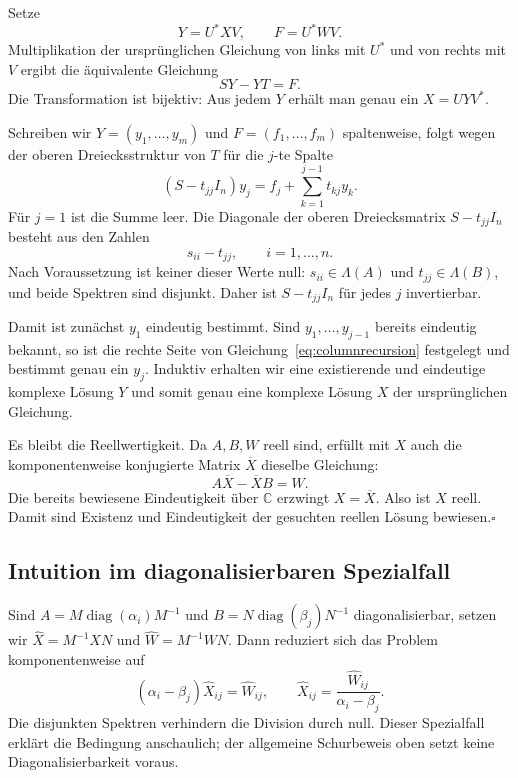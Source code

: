 \documentclass[11pt,a4paper]{article}
\begin{document}
Setze
\begin{equation}
 Y=U^*XV,\qquad F=U^*WV.
\end{equation}
Multiplikation der ursprünglichen Gleichung von links mit $U^*$ und von rechts mit $V$ ergibt die äquivalente Gleichung
\begin{equation}\label{eq:schursylvester}
 SY-YT=F.
\end{equation}
Die Transformation ist bijektiv: Aus jedem $Y$ erhält man genau ein $X=UYV^*$.

Schreiben wir $Y=(y_1,\ldots,y_m)$ und $F=(f_1,\ldots,f_m)$ spaltenweise, folgt wegen der oberen Dreiecksstruktur von $T$ für die $j$-te Spalte
\begin{equation}\label{eq:columnrecursion}
 (S-t_{jj}I_n)y_j
 =f_j+\sum_{k=1}^{j-1}t_{kj}y_k.
\end{equation}
Für $j=1$ ist die Summe leer. Die Diagonale der oberen Dreiecksmatrix $S-t_{jj}I_n$ besteht aus den Zahlen
\begin{equation}
 s_{ii}-t_{jj},\qquad i=1,\ldots,n.
\end{equation}
Nach Voraussetzung ist keiner dieser Werte null: $s_{ii}\in\Lambda(A)$ und $t_{jj}\in\Lambda(B)$, und beide Spektren sind disjunkt. Daher ist $S-t_{jj}I_n$ für jedes $j$ invertierbar.

Damit ist zunächst $y_1$ eindeutig bestimmt. Sind $y_1,\ldots,y_{j-1}$ bereits eindeutig bekannt, so ist die rechte Seite von Gleichung~\eqref{eq:columnrecursion} festgelegt und bestimmt genau ein $y_j$. Induktiv erhalten wir eine existierende und eindeutige komplexe Lösung $Y$ und somit genau eine komplexe Lösung $X$ der ursprünglichen Gleichung.

Es bleibt die Reellwertigkeit. Da $A,B,W$ reell sind, erfüllt mit $X$ auch die komponentenweise konjugierte Matrix $\overline X$ dieselbe Gleichung:
\begin{equation}
 A\overline X-\overline X B=W.
\end{equation}
Die bereits bewiesene Eindeutigkeit über $\mathbb C$ erzwingt $X=\overline X$. Also ist $X$ reell. Damit sind Existenz und Eindeutigkeit der gesuchten reellen Lösung bewiesen.\hfill$\square$

\subsection{Intuition im diagonalisierbaren Spezialfall}
Sind $A=M\operatorname{diag}(\alpha_i)M^{-1}$ und $B=N\operatorname{diag}(\beta_j)N^{-1}$ diagonalisierbar, setzen wir $\widehat X=M^{-1}XN$ und $\widehat W=M^{-1}WN$. Dann reduziert sich das Problem komponentenweise auf
\begin{equation}
 (\alpha_i-\beta_j)\widehat X_{ij}=\widehat W_{ij},\qquad
 \widehat X_{ij}=\frac{\widehat W_{ij}}{\alpha_i-\beta_j}.
\end{equation}
Die disjunkten Spektren verhindern die Division durch null. Dieser Spezialfall erklärt die Bedingung anschaulich; der allgemeine Schurbeweis oben setzt keine Diagonalisierbarkeit voraus.
\end{document}
